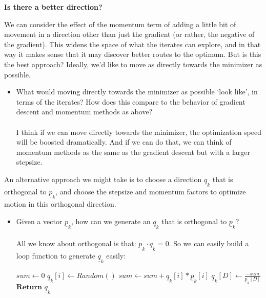 \documentclass[11pt,letterpaper]{article}
\begin{document}
\newpage

\begin{flushleft}
    \textbf{Is there a better direction?}
\end{flushleft}

\begin{flushleft}
    \justifying
    We can consider the effect of the momentum term of adding a little bit of movement in a direction other than just the gradient (or rather, the negative of the gradient). This widens the space of what the iterates can explore, and in that way it makes sense that it may discover better routes to the optimum. But is this the best approach? Ideally, we’d like to move as directly towards the minimizer as possible.
\end{flushleft}

\begin{tcolorbox}
    \begin{itemize}
        \item What would moving directly towards the minimizer as possible ‘look like’, in terms of the iterates? How does this compare to the behavior of gradient descent and momentum methods as above?
        \\\\
        I think if we can move directly towards the minimizer, the optimization speed will be boosted dramatically. And if we can do that, we can think of momentum methods as the same as the gradient descent but with a larger stepsize.
    \end{itemize}
\end{tcolorbox}
An alternative approach we might take is to choose a direction $\underline q_k$ that is orthogonal to $\underline p_k$, and choose the stepsize and momentum factors to optimize motion in this orthogonal direction.
\begin{tcolorbox}
    \begin{itemize}
        \item Given a vector $\underline p_k$, how can we generate an $\underline q_k$ that is orthogonal to $\underline p_k$?
        \\\\
        All we know about orthogonal is that: $\underline p_k \cdot \underline q_k = 0$. So we can easily build a loop function to generate $\underline q_k$ easily:

        \begin{algorithmic}[1]
            \State $sum \gets 0$
                \State $\underline q_k[i] \gets  Random()$
                \State $sum \gets sum + \underline q_k[i] *\underline p_k[i]$
            \EndFor
            \State $\underline q_k[D] \gets \frac{-sum}{\underline p_k[D]}$
            \State $\textbf{Return } \underline q_k$
        \end{algorithmic}
    \end{itemize}
\end{tcolorbox}
\end{document}
